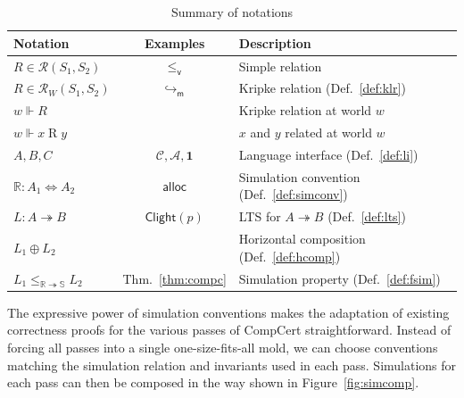 \documentclass[11pt,oneside,draft]{book}
\theoremstyle{definition}
\newcommand{\kw}[1]{\ensuremath{ \mathsf{#1} }}
\newcommand{\que}{\circ}         %
\newcommand{\ans}{\bullet}       %
\newcommand{\vref}{\le_\kw{v}}   %
\newcommand{\figsize}{}
\begin{document}
\begin{table} %
  \centering
  \figsize
  \begin{tabular}{lcl}
    \hline
    Notation & Examples & Description \\
    \hline
    $R \in \mathcal{R}(S_1, S_2)$ &
      $\vref$ &
      Simple relation \\
    $R \in \mathcal{R}_W(S_1, S_2)$ &
      $\hookrightarrow_\kw{m}$ &
      Kripke relation (Def.~\ref{def:klr}) \\
    $w \Vdash R$ & &
      Kripke relation at world $w$ \\
    $w \Vdash x \mathrel{R} y$ & &
      $x$ and $y$ related at world $w$ \\
    \hline
    $A, B, C$ &
      $\mathcal{C}, \mathcal{A}, \mathbf{1}$ &
      Language interface (Def.~\ref{def:li}) \\
    $\mathbb{R} : A_1 \Leftrightarrow A_2$ &
      $\kw{alloc}$ &
      Simulation convention (Def.~\ref{def:simconv}) \\
    $L : A \twoheadrightarrow B$ &
      $\kw{Clight}(p)$ &
      LTS for $A \twoheadrightarrow B$ (Def.~\ref{def:lts}) \\
    $L_1 \oplus L_2$ & &
      Horizontal composition (Def.~\ref{def:hcomp}) \\
    $L_1 \le_{\mathbb{R} \twoheadrightarrow \mathbb{S}} L_2$ &
      Thm.~\ref{thm:compc} &
      Simulation property (Def.~\ref{def:fsim}) \\
    \hline
  \end{tabular}
  \caption{Summary of notations}
  \label{tbl:notations}
\end{table}

The expressive power of simulation conventions
makes the adaptation of existing correctness proofs
for the various passes of CompCert straightforward.
Instead of forcing all passes into a single one-size-fits-all mold,
we can choose conventions matching
the simulation relation and invariants
used in each pass.
Simulations for each pass can then be composed
in the way shown in Figure~\ref{fig:simcomp}.
\end{document}
